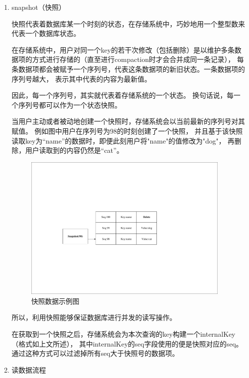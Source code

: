 		\begin{enumerate}
		\item snapshot（快照）
		
		快照代表着数据库某一个时刻的状态，在存储系统中，巧妙地用一个整型数来代表一个数据库状态。

		在存储系统中，用户对同一个key的若干次修改（包括删除）是以维护多条数据项的方式进行存储的（直至进行compaction时才会合并成同一条记录），
		每条数据项都会被赋予一个序列号，代表这条数据项的新旧状态。一条数据项的序列号越大，
		表示其中代表的内容为最新值。

		因此，每一个序列号，其实就代表着存储系统的一个状态。
		换句话说，每一个序列号都可以作为一个状态快照。

		当用户主动或者被动地创建一个快照时，存储系统会以当前最新的序列号对其赋值。
		例如图中用户在序列号为98的时刻创建了一个快照，
		并且基于该快照读取key为“name”的数据时，即便此刻用户将"name"的值修改为"dog"，
		再删除，用户读取到的内容仍然是“cat”。

		\begin{figure}[H]
			\centering
			\includegraphics[width=0.95\textwidth]{pdf/snapshot.pdf}
			\caption{快照数据示例图}
			\label{snapshot}
		\end{figure}

		所以，利用快照能够保证数据库进行并发的读写操作。

		在获取到一个快照之后，存储系统会为本次查询的key构建一个internalKey（格式如上文所述），
		其中internalKey的seq字段使用的便是快照对应的seq。
		通过这种方式可以过滤掉所有seq大于快照号的数据项。
		

		\item 读数据流程
		

\end{enumerate}
